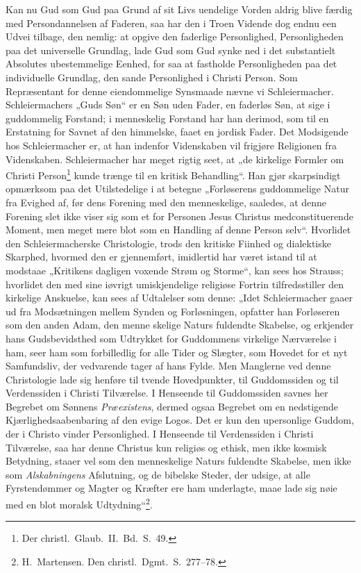 \documentclass[12pt]{book}
\begin{document}
Kan nu Gud som Gud paa Grund af sit Livs uendelige Vorden aldrig
blive færdig med Persondannelsen af Faderen, saa har den i Troen
Vidende dog endnu een Udvei tilbage, den nemlig: at opgive den
faderlige Personlighed, Personligheden paa det universelle Grundlag,
lade Gud som Gud synke ned i det substantielt Absolutes
ubestemmelige Eenhed, for saa at fastholde Personligheden paa det
individuelle Grundlag, den sande Personlighed i Christi Person. Som
Repræsentant for denne eiendommelige Synsmaade nævne vi
Schleiermacher. Schleiermachers „Guds Søn“ er en Søn uden Fader, en
faderløs Søn, at sige i guddommelig Forstand; i menneskelig Forstand
har han derimod, som til en Erstatning for Savnet af den himmelske,
faaet en jordisk Fader. Det Modsigende hos Schleiermacher er, at han
indenfor Videnskaben vil frigjøre Religionen fra Videnskaben.
Schleiermacher har meget rigtig seet, at „de kirkelige Formler om
Christi Person\footnote{Der christl.\ Glaub.\ II.\ Bd.\ S.\ 49.}
kunde trænge til en kritisk Behandling“. Han gjør skarpsindigt
opmærksom paa det Utilstedelige i at betegne „Forløserens
guddommelige Natur fra Evighed af, før dens Forening med den
menneskelige, saaledes, at denne Forening slet ikke viser sig som et
for Personen Jesus Christus medconstituerende Moment, men meget mere
blot som en Handling af denne Person selv“. Hvorlidet den
Schleiermacherske Christologie, trods den kritiske Fiinhed og
dialektiske Skarphed, hvormed den er gjennemført, imidlertid har
været istand til at modstaae „Kritikens dagligen voxende Strøm og
Storme“, kan sees hos Strauss; hvorlidet den med sine iøvrigt
umiskjendelige religiøse Fortrin tilfredsstiller den kirkelige
Anskuelse, kan sees af Udtalelser som denne: „Idet Schleiermacher
gaaer ud fra Modsætningen mellem Synden og Forløsningen, opfatter
han Forløseren som den anden Adam, den menne\-
skelige Naturs fuldendte Skabelse, og erkjender hans Gudsbevidsthed
som Udtrykket for Guddommens virkelige Nærværelse i ham, seer ham
som forbilledlig for alle Tider og Slægter, som Hovedet for et nyt
Samfundsliv, der vedvarende tager af hans Fylde. Men Manglerne ved
denne Christologie lade sig henføre til tvende Hovedpunkter, til
Guddomssiden og til Verdenssiden i Christi Tilværelse. I Henseende
til Guddomssiden savnes her Begrebet om Sønnens \emph{Præexistens},
dermed ogsaa Begrebet om en nedstigende Kjærlighedsaabenbaring af
den evige Logos. Det er kun den upersonlige Guddom, der i Christo
vinder Personlighed. I Henseende til Verdenssiden i Christi
Tilværelse, saa har denne Christus kun religiøs og ethisk, men ikke
kosmisk Betydning, staaer vel som den menneskelige Naturs fuldendte
Skabelse, men ikke som \emph{Alskabningens} Afslutning,
og de bibelske
Steder, der udsige, at alle Fyrstendømmer og Magter og Kræfter ere
ham underlagte, maae lade sig nøie med en blot moralsk
Udtydning“\footnote{H.\ Martensen. Den christl.\ Dgmt.\
S.\ 277--78.}.
\end{document}
